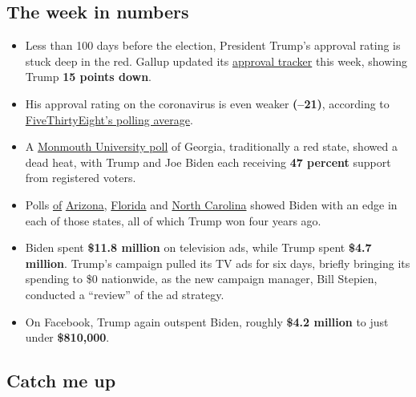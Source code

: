 \hypertarget{the-week-in-numbers}{%
\subsection{The week in numbers}\label{the-week-in-numbers}}

\begin{itemize}
\item
  Less than 100 days before the election, President Trump's approval
  rating is stuck deep in the red. Gallup updated its
  \href{https://news.gallup.com/poll/203207/trump-job-approval-weekly.aspx}{approval
  tracker} this week, showing Trump \textbf{15 points down}.
\item
  His approval rating on the coronavirus is even weaker \textbf{(--21)},
  according to
  \href{https://projects.fivethirtyeight.com/coronavirus-polls/}{FiveThirtyEight's
  polling average}.
\item
  A
  \href{https://www.monmouth.edu/polling-institute/reports/monmouthpoll_GA_072920/}{Monmouth
  University poll} of Georgia, traditionally a red state, showed a dead
  heat, with Trump and Joe Biden each receiving \textbf{47 percent}
  support from registered voters.
\item
  Polls
  \href{http://maristpoll.marist.edu/wp-content/uploads/2020/07/NBC-News_Marist-Poll-AZ-NOS-and-Tables_202007231249.pdf}{of}
  \href{https://cdn.cnn.com/cnn/2020/images/07/26/rel1_az.pdf}{Arizona},
  \href{https://cdn.cnn.com/cnn/2020/images/07/26/rel1_fl.pdf}{Florida}
  and
  \href{https://assets.documentcloud.org/documents/7007170/NBC-News-Marist-Poll-NC-Annotated-Questionnaire.pdf}{North
  Carolina} showed Biden with an edge in each of those states, all of
  which Trump won four years ago.
\end{itemize}

\begin{itemize}
\item
  Biden spent \textbf{\$11.8 million} on television ads, while Trump
  spent \textbf{\$4.7 million}. Trump's campaign pulled its TV ads for
  six days, briefly bringing its spending to \$0 nationwide, as the new
  campaign manager, Bill Stepien, conducted a ``review'' of the ad
  strategy.
\item
  On Facebook, Trump again outspent Biden, roughly \textbf{\$4.2
  million} to just under \textbf{\$810,000}.
\end{itemize}

\hypertarget{catch-me-up}{%
\subsection{Catch me up}\label{catch-me-up}}

